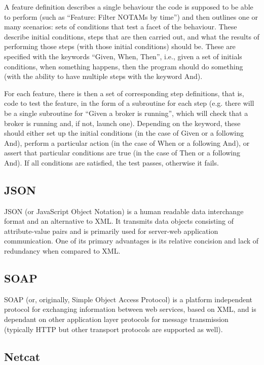 \documentclass[a4paper, 12pt]{article}
\begin{document}
A feature definition describes a single behaviour the code is supposed to be able to perform (such as ``Feature: Filter NOTAMs by time'') and then outlines one or many scenarios: sets of conditions that test a facet of the behaviour. These describe initial conditions, steps that are then carried out, and what the results of performing those steps (with those initial conditions) should be. These are specified with the keywords ``Given, When, Then'', i.e., given a set of initials conditions, when something happens, then the program should do something (with the ability to have multiple steps with the keyword And). 

For each feature, there is then a set of corresponding step definitions, that is, code to test the feature, in the form of a subroutine for each step (e.g. there will be a single subroutine for ``Given a broker is running'', which will check that a broker is running and, if not, launch one). Depending on the keyword, these should either set up the initial conditions (in the case of Given or a following And), perform a particular action (in the case of When or a following And), or assert that particular conditions are true (in the case of Then or a following And). If all conditions are satisfied, the test passes, otherwise it fails.

\subsection{JSON}

JSON (or JavaScript Object Notation) is a human readable data interchange format and an alternative to XML. It transmits data objects consisting of attribute-value pairs and is primarily used for server-web application communication. One of its primary advantages is its relative concision and lack of redundancy when compared to XML.

\subsection{SOAP}

SOAP (or, originally, Simple Object Access Protocol) is a platform independent protocol for exchanging information between web services, based on XML, and is dependant on other application layer protocols for message transmission (typically HTTP but other transport protocols are supported as well). 

\subsection{Netcat}
\end{document}
